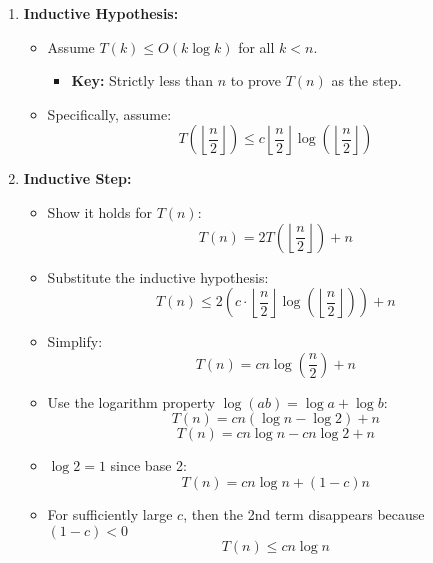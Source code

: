 \begin{example}
\begin{enumerate}
            \item \textbf{Inductive Hypothesis:}
            \begin{itemize}
                \item Assume \( T(k) \leq O(k \log k) \) for all \( k < n \).
                \begin{itemize}
                    \item \textbf{Key:} Strictly less than $n$ to prove $T(n)$ as the step.
                \end{itemize}
                \item Specifically, assume:
                \[
                T\left( \left\lfloor \frac{n}{2} \right\rfloor \right) \leq c \left\lfloor \frac{n}{2} \right\rfloor \log\left( \left\lfloor \frac{n}{2} \right\rfloor \right) 
                \]
            \end{itemize}
        
            \item \textbf{Inductive Step:}
            \begin{itemize}
                \item Show it holds for \( T(n) \):
                \[
                T(n) = 2T\left(\left\lfloor \frac{n}{2} \right\rfloor\right) + n
                \]
                \item Substitute the inductive hypothesis:
                \[
                T(n) \leq 2 \left(c \cdot \left\lfloor \frac{n}{2} \right\rfloor \log\left(\left\lfloor \frac{n}{2} \right\rfloor \right)\right) + n
                \]

                \item Simplify:
                \[
                T(n)= cn \log\left(\frac{n}{2}\right) + n
                \]
                \item Use the logarithm property \( \log(ab) = \log a + \log b \):
                \[
                T(n)= cn(\log n - \log 2) + n
                \]
                \[
                T(n)= cn \log n - cn \log 2 + n
                \]
                \item $\log 2 = 1$ since base 2:
                \[
                T(n) = cn \log n + (1-c)n
                \]
                \item For sufficiently large $c$, then the 2nd term disappears because $(1-c)<0$
                \[
                T(n) \leq cn \log n
                \]       
            \end{itemize}
        \end{enumerate}
    \end{example}

